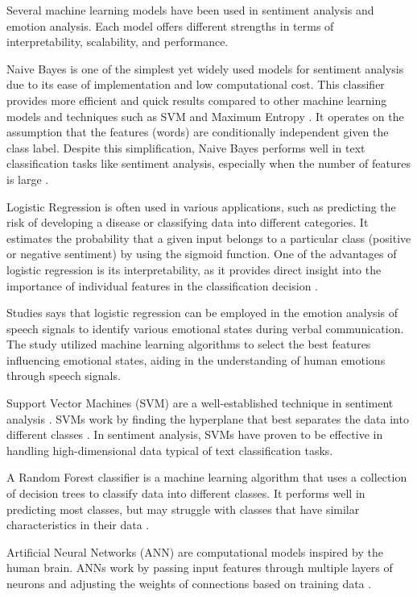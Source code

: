 Several machine learning models have been used in sentiment analysis and emotion analysis. Each model offers different strengths in terms of interpretability, scalability, and performance.

Naive Bayes is one of the simplest yet widely used models for sentiment analysis due to its ease of implementation and low computational cost. This classifier provides more efficient and quick results compared to other machine learning models and techniques such as SVM and Maximum Entropy \cite{Mathapati2017}. It operates on the assumption that the features (words) are conditionally independent given the class label. Despite this simplification, Naive Bayes performs well in text classification tasks like sentiment analysis, especially when the number of features is large \cite{Saini2021}.

Logistic Regression is often used in various applications, such as predicting the risk of developing a disease or classifying data into different categories. It estimates the probability that a given input belongs to a particular class (positive or negative sentiment) by using the sigmoid function. One of the advantages of logistic regression is its interpretability, as it provides direct insight into the importance of individual features in the classification decision \cite{Pathan2018}.

Studies says that logistic regression can be employed in the emotion analysis of speech signals to identify various emotional states during verbal communication. The study utilized machine learning algorithms to select the best features influencing emotional states, aiding in the understanding of human emotions through speech signals\cite{Poovammal2016}.

Support Vector Machines (SVM) are a well-established technique in sentiment analysis \cite{Mahmood2020}. SVMs work by finding the hyperplane that best separates the data into different classes \cite{Gillet2007}. In sentiment analysis, SVMs have proven to be effective in handling high-dimensional data typical of text classification tasks.

A Random Forest classifier is a machine learning algorithm that uses a collection of decision trees to classify data into different classes. It performs well in predicting most classes, but may struggle with classes that have similar characteristics in their data \cite{Senturk2023}.

Artificial Neural Networks (ANN) are computational models inspired by the human brain. ANNs work by passing input features through multiple layers of neurons and adjusting the weights of connections based on training data \cite{Walczak2003}.

